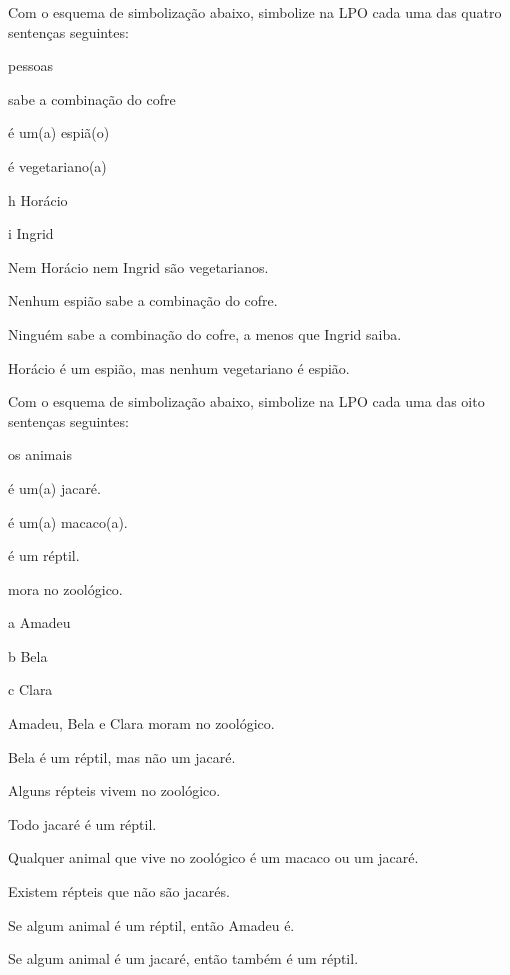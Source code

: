 \problempart
\label{pr.FOLvegetarians}
Com o esquema de simbolização abaixo, simbolize na LPO cada uma das quatro sentenças seguintes:
\begin{center}
\begin{ekey}
\item[\text{domínio}] pessoas
\item[\atom{C}{x}]  sabe a combinação do cofre
\item[\atom{E}{x}]  é um(a) espiã(o)
\item[\atom{V}{x}]  é vegetariano(a)
\item[h] Horácio
\item[i] Ingrid
\end{ekey}
\end{center}
\begin{earg}
\item Nem Horácio nem Ingrid são vegetarianos.
\item Nenhum espião sabe a combinação do cofre.
\item Ninguém sabe a combinação do cofre, a menos que Ingrid saiba.
\item Horácio é um espião, mas nenhum vegetariano é espião.
\end{earg}
\solutions

\problempart\label{pr.FOLalligators}
Com o esquema de simbolização abaixo, simbolize na LPO cada uma das oito sentenças seguintes:
\begin{center}
\begin{ekey}
\item[\text{domínio}] os animais
\item[\atom{J}{x}]  é um(a) jacaré.
\item[\atom{M}{x}]  é um(a) macaco(a).
\item[\atom{R}{x}]  é um réptil.
\item[\atom{Z}{x}]  mora no zoológico.
\item[a] Amadeu
\item[b] Bela
\item[c] Clara
\end{ekey}
\end{center}
\begin{earg}
\item Amadeu, Bela e Clara moram no zoológico.
\item Bela é um réptil, mas não um jacaré.
\item Alguns répteis vivem no zoológico.
\item Todo jacaré é um réptil.
\item Qualquer animal que vive no zoológico é um macaco ou um jacaré.
\item Existem répteis que não são jacarés.
\item Se algum animal é um réptil, então Amadeu é.
\item Se algum animal é um jacaré, então também é um réptil.\end{earg}

